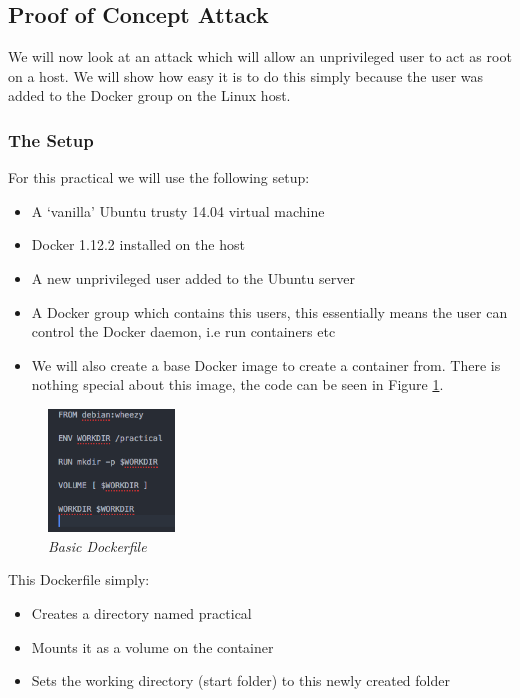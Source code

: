 \documentclass{article}
\begin{document}
\subsection{Proof of Concept Attack}
\label{sub:attack}
We will now look at an attack which will allow an unprivileged user to act as root on a host. We will show how easy it is to do this simply because the user was added to the Docker group on the Linux host. 

\subsubsection{The Setup}
For this practical we will use the following setup:

\begin{itemize}
  \item A `vanilla' Ubuntu trusty 14.04 virtual machine
  \item Docker 1.12.2 installed on the host
  \item A new unprivileged user added to the Ubuntu server
  \item A Docker group which contains this users, this essentially means the user can control the Docker daemon, i.e run containers etc
  \item We will also create a base Docker image to create a container from. There is nothing special about this image, the code can be seen in Figure \ref{fig:dockerfile}.
\end{itemize}

\begin{figure}[!h]
\centering
\includegraphics*[width=0.3\textwidth]{components/images/dockerfile}
\caption{\em Basic Dockerfile}
\label{fig:dockerfile}
\end{figure}

This Dockerfile simply:

\begin{itemize}
  \item Creates a directory named practical
  \item Mounts it as a volume on the container
  \item Sets the working directory (start folder) to this newly created folder
\end{itemize}
\end{document}
